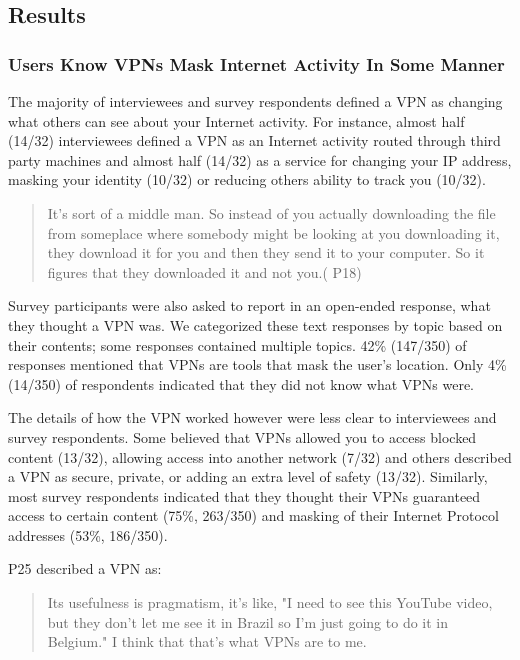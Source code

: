 \subsection{Results}\label{sec:results}

\subsubsection{Users Know VPNs Mask Internet Activity In Some Manner}

The majority of interviewees and survey respondents defined a VPN as changing what others can see about your Internet activity. For instance, almost half (14/32) interviewees defined a VPN as an
Internet activity routed through third party machines and almost half (14/32) as a service for changing your IP
address, masking your identity (10/32) or reducing others ability to track
you (10/32).  \begin{quote}It's sort of a middle man. So instead of you actually
downloading the file from someplace where somebody might be looking at you
downloading it, they download it for you and then they send it to your
computer. So it figures that they downloaded it and not you.( P18)\end{quote}

Survey participants were also asked to report in an open-ended response, what they
thought a VPN was. We categorized these text responses by topic based on their
contents; some responses contained multiple topics.   42\% (147/350) of
responses mentioned that VPNs are tools that mask the user’s location. Only
4\% (14/350) of respondents indicated that they did not know what VPNs were.

The details of how the VPN worked however were less clear to interviewees and survey respondents. Some believed that VPNs allowed you to  access blocked content (13/32), allowing access into another network (7/32) and others described a VPN as secure,  private, or adding an extra level of safety (13/32). Similarly, most survey respondents indicated that they thought their VPNs guaranteed access to certain content
 (75\%, 263/350) and masking of their Internet Protocol addresses (53\%, 186/350).


P25 described a VPN as:
\begin{quote} Its usefulness is pragmatism, it's like, "I need to see this YouTube video, but they don't let me see it in Brazil so I'm just going to do it
    in Belgium." I think that that's what VPNs are to me. \end{quote}
    
